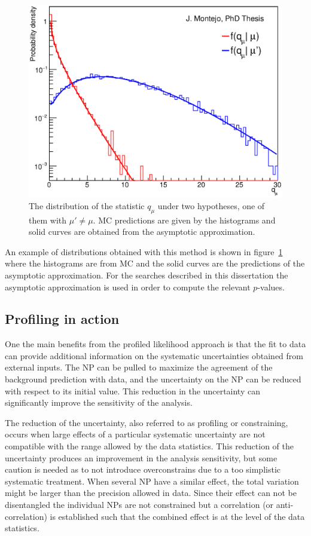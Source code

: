     \begin{figure}[tb!]
      \begin{center}
        \includegraphics[width=.7\textwidth]{Statistics/Figures/pvalue_mu_muprime_hist1.eps}
        \caption{
          The distribution of the statistic $q_\mu$ under two hypotheses, one of them with $\mu' \neq \mu$. 
          MC predictions are given by the histograms and solid curves are obtained from the asymptotic approximation.
          \label{fig:asimov}}
      \end{center}
    \end{figure}

    An example of distributions obtained with this method is shown in figure~\ref{fig:asimov}
    where the histograms are from MC and the solid curves are the predictions of the asymptotic approximation.
    For the searches described in this dissertation the asymptotic approximation is used in order to compute the relevant $p$-values.

   \subsection{Profiling in action}
   One the main benefits from the profiled likelihood approach is that the fit to data can provide additional information on the systematic uncertainties obtained from external inputs. The NP can be pulled to maximize the agreement of the background prediction with data, and the uncertainty on the NP can be reduced with respect to its initial value. This reduction in the uncertainty can significantly improve the sensitivity of the analysis.

   The reduction of the uncertainty, also referred to as profiling or constraining, occurs when large effects of a particular systematic uncertainty are not compatible with the range allowed by the data statistics. This reduction of the uncertainty produces an improvement in the analysis sensitivity, but some caution is needed as to not introduce overconstrains due to a too simplistic systematic treatment.
   When several NP have a similar effect, the total variation might be larger than the precision allowed in data. Since their effect can not be disentangled the individual NPs are not constrained but a correlation (or anti-correlation) is established such that the combined effect is at the level of the data statistics. 

